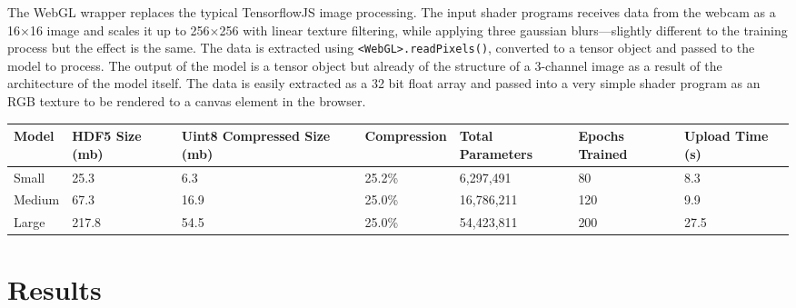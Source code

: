 \documentclass{article}
\begin{document}
The WebGL wrapper replaces the typical TensorflowJS image processing. The input shader programs receives data from the webcam as a 16$\times$16 image and scales it up to 256$\times$256 with linear texture filtering, while applying three gaussian blurs---slightly different to the training process but the effect is the same. The data is extracted using \verb|<WebGL>.readPixels()|, converted to a tensor object and passed to the model to process. The output of the model is a tensor object but already of the structure of a 3-channel image as a result of the architecture of the model itself. The data is easily extracted as a 32 bit float array and passed into a very simple shader program as an RGB texture to be rendered to a canvas element in the browser.

\begin{small}
	\begin{center}
		\begin{tabularx}{\textwidth}{bbbbbbb}
			\toprule
			Model  & HDF5 Size (mb) & Uint8 Compressed Size (mb) & Compression & Total Parameters & Epochs Trained & Upload Time (s) \\
			\midrule
			Small  & 25.3           & 6.3                        & 25.2\%      & 6,297,491        & 80             & 8.3             \\
			Medium & 67.3           & 16.9                       & 25.0\%      & 16,786,211       & 120            & 9.9             \\
			Large  & 217.8          & 54.5                       & 25.0\%      & 54,423,811       & 200            & 27.5            \\
			\bottomrule
		\end{tabularx}
		\label{table:model_details}
	\end{center}
\end{small}

\section{Results\label{section:results}}
\end{document}
